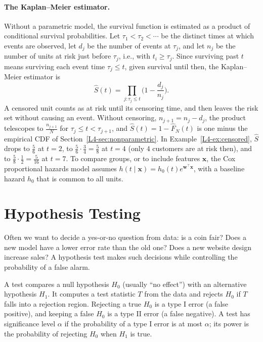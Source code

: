 \paragraph{The Kaplan--Meier estimator.} Without a parametric model, the survival function is estimated as a product of conditional survival probabilities. Let $\tau_1 < \tau_2 < \cdots$ be the distinct times at which events are observed, let $d_j$ be the number of events at $\tau_j$, and let $n_j$ be the number of units at risk just before $\tau_j$, i.e., with $t_i \geq \tau_j$. Since surviving past $t$ means surviving each event time $\tau_j \leq t$, given survival until then, the Kaplan--Meier estimator is
\[\hat S(t) = \prod_{j : \tau_j \leq t}\Big(1 - \frac{d_j}{n_j}\Big).\]
A censored unit counts as at risk until its censoring time, and then leaves the risk set without causing an event. Without censoring, $n_{j+1} = n_j - d_j$, the product telescopes to $\frac{n_{j+1}}{N}$ for $\tau_j \leq t < \tau_{j+1}$, and $\hat S(t) = 1 - \hat F_N(t)$ is one minus the empirical CDF of Section~\ref{L4-sec:nonparametric}. In Example~\ref{L4-ex:censored}, $\hat S$ drops to $\frac{5}{6}$ at $t = 2$, to $\frac{5}{6} \cdot \frac{3}{4} = \frac{5}{8}$ at $t = 4$ (only $4$ customers are at risk then), and to $\frac{5}{8} \cdot \frac{1}{2} = \frac{5}{16}$ at $t = 7$. To compare groups, or to include features $\mathbf{x}$, the Cox proportional hazards model assumes $h(t \mid \mathbf{x}) = h_0(t)e^{\mathbf{w}^\top\mathbf{x}}$, with a baseline hazard $h_0$ that is common to all units.

\section{Hypothesis Testing}\label{L4-sec:testing}

Often we want to decide a yes-or-no question from data: is a coin fair? Does a new model have a lower error rate than the old one? Does a new website design increase sales? A hypothesis test makes such decisions while controlling the probability of a false alarm.

\begin{definition}\label{L4-def:test}
    A test compares a null hypothesis $H_0$ (usually ``no effect'') with an alternative hypothesis $H_1$. It computes a test statistic $T$ from the data and rejects $H_0$ if $T$ falls into a rejection region. Rejecting a true $H_0$ is a type I error (a false positive), and keeping a false $H_0$ is a type II error (a false negative). A test has significance level $\alpha$ if the probability of a type I error is at most $\alpha$; its power is the probability of rejecting $H_0$ when $H_1$ is true.
\end{definition}

